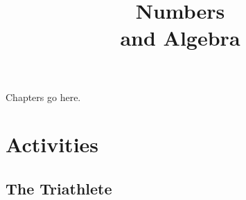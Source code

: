 \documentclass[justified,openany,nofonts]{tufte-book}
\title{Numbers \\ and Algebra}
\author{\teachingnotes}
\renewcommand{\theenumi}{$(\mathrm{\arabic{enumi}})$}
\renewcommand{\labelenumi}{\theenumi}
\begin{document}
\def\document#1{} %
\maketitle

\newpage
\setcounter{secnumdepth}{2}%

Chapters go here.  



\appendix

\renewcommand{\theenumi}{$(\mathrm{\alph{enumi}})$}
\renewcommand{\labelenumi}{\theenumi}
\chapter{Activities}


\section{The Triathlete}\label{A:Triathlete}
\end{document}

